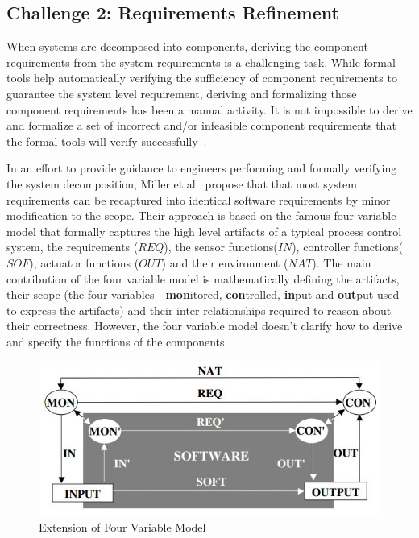 \subsection{Challenge 2: Requirements Refinement}

When systems are decomposed into components, deriving the component requirements from the system requirements is a challenging task. While formal tools help automatically verifying the sufficiency of component requirements to guarantee the system level requirement, deriving and formalizing those component requirements has been a manual activity. It is not impossible to derive and formalize a set of incorrect and/or infeasible component requirements that the formal tools will verify successfully~\cite{gacek2015towards}. 

In an effort to provide guidance to engineers performing and formally verifying the system decomposition, Miller et al~\cite{extending4varmodel} propose that that most system requirements can be recaptured into identical software requirements by minor modification to the scope. Their approach is based on the famous four variable model that formally captures the high level artifacts of a typical process control system, the requirements ($REQ$), the sensor functions($IN$), controller functions($SOF$), actuator functions ($OUT$) and their environment ($NAT$). The main contribution of the four variable model is mathematically defining the artifacts, their scope (the four variables - \textbf{mon}itored, \textbf{con}trolled, \textbf{in}put and \textbf{out}put used to express the artifacts) and their inter-relationships required to reason about their correctness. However, the four variable model doesn't clarify how to derive and specify the functions of the components.

\begin{figure}[h!]
    \centering
    \includegraphics[scale=0.6] {images/FourVarExtn.jpg}
    \caption{Extension of Four Variable Model}
    \label{fig:extn-four-var}
 \end{figure}

